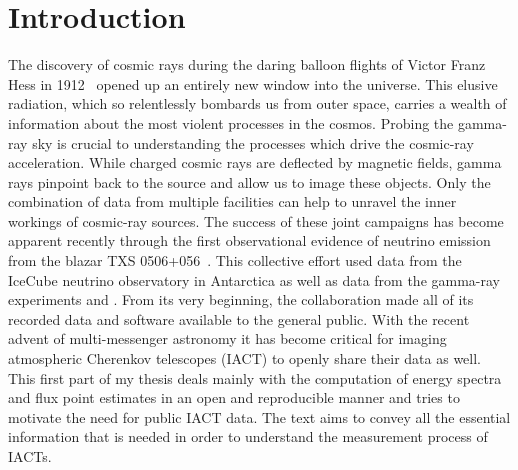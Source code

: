 \chapter{Introduction}

The discovery of cosmic rays during the daring balloon flights of Victor Franz Hess in 1912~\cite{hess_original} opened up
an entirely new window into the universe.
This elusive radiation, which so relentlessly bombards us from outer space, carries a wealth of information
about the most violent processes in the cosmos. 
Probing the gamma-ray sky is crucial to understanding the processes which drive the cosmic-ray acceleration.
While charged cosmic rays are deflected by magnetic fields, gamma rays pinpoint back to the source and allow us to image these objects. 
Only the combination of data from multiple facilities can help to unravel the inner workings of
cosmic-ray sources. 
The success of these joint campaigns has become apparent recently through the first observational evidence
of neutrino emission from the blazar TXS 0506+056~\cite{icecube2018multimessenger}. 
This collective effort used data from the IceCube neutrino observatory in Antarctica as well as data from the gamma-ray 
experiments \fermi and \magic. 
From its very beginning, the \fermi collaboration made all of its recorded data and software available to the general public.
With the recent advent of multi-messenger astronomy it has become critical for imaging atmospheric Cherenkov telescopes (IACT)
to openly share their data as well.
This first part of my thesis deals mainly with the
computation of energy spectra and flux point estimates in an open and reproducible manner and tries to motivate the need for public IACT data. 
The text aims to convey all the essential information that is needed in order to understand the measurement process of IACTs. 

